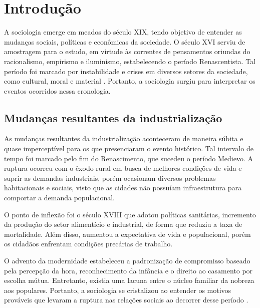 \section{Introdução}\label{intro}



A sociologia emerge em meados do século XIX, tendo objetivo de entender as mudanças sociais, políticas e econômicas da sociedade.
O século XVI serviu de amostragem para o estudo, em virtude às correntes de pensamentos oriundas do racionalismo, empirismo e iluminismo, estabelecendo o período Renascentista.
Tal período foi marcado por instabilidade e crises em diversos setores da sociedade, como cultural, moral e material \cite{quintaneiro2003toque}.
Portanto, a sociologia surgiu para interpretar os eventos ocorridos nessa cronologia.



\subsection{Mudanças resultantes da industrialização}

As mudanças resultantes da industrialização aconteceram de maneira súbita e quase imperceptível para os que presenciaram o evento histórico.
Tal intervalo de tempo foi marcado pelo fim do Renascimento, que sucedeu o período Medievo.
A ruptura ocorreu com o êxodo rural em busca de melhores condições de vida e suprir as demandas industriais, porém ocasionam diversos problemas habitacionais e sociais, visto que as cidades não possuíam infraestrutura para comportar a demanda populacional.

O ponto de inflexão foi o século XVIII que adotou políticas sanitárias, incremento da produção do setor alimentício e industrial, de forma que reduziu a taxa de mortalidade. 
Além disso, aumentou a expectativa de vida e populacional, porém os cidadãos enfrentam condições precárias de trabalho.

O advento da modernidade estabeleceu a padronização de compromisso baseado pela percepção da hora, reconhecimento da infância e o direito ao casamento por escolha mútua.
Entretanto, existia uma lacuna entre o núcleo familiar da nobreza aos populares.
Portanto, a sociologia se cristalizou ao entender os motivos prováveis que levaram a ruptura nas relações sociais ao decorrer desse período \cite{quintaneiro2003toque}.



